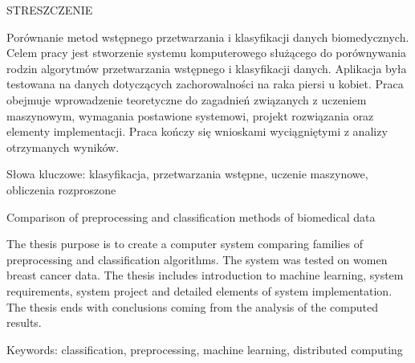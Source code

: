 \documentclass[../thesis.tex]{subfiles}
\begin{document}
\begin{center}
\fontsize{14pt}{18pt}\selectfont
STRESZCZENIE
\end{center}

\begin{flushleft}
Porównanie metod wstępnego przetwarzania i klasyfikacji danych biomedycznych. Celem pracy jest stworzenie systemu komputerowego służącego do porównywania rodzin algorytmów przetwarzania wstępnego i klasyfikacji danych. Aplikacja była testowana na danych dotyczących zachorowalności na raka piersi u kobiet. Praca obejmuje wprowadzenie teoretyczne do zagadnień związanych z uczeniem maszynowym, wymagania postawione systemowi, projekt rozwiązania oraz elementy implementacji. Praca kończy się wnioskami wyciągniętymi z analizy otrzymanych wyników.

\vspace{7.5cm}

Słowa kluczowe: klasyfikacja, przetwarzania wstępne, uczenie maszynowe, obliczenia rozproszone
\end{flushleft}

\noindent\makebox[\linewidth]{\rule{\linewidth}{0.4pt}}

\begin{center}
\fontsize{14pt}{18pt}\selectfont
Comparison of preprocessing and classification methods of biomedical data
\end{center}

\begin{flushleft}
The thesis purpose is to create a computer system comparing families of preprocessing and classification algorithms. The system was tested on women breast cancer data. The thesis includes introduction to machine learning, system requirements, system project and detailed elements of system implementation. The thesis ends with conclusions coming from the analysis of the computed results.

\vspace{7.5cm}

Keywords: classification, preprocessing, machine learning, distributed computing
\end{flushleft}

\thispagestyle{empty}
\cleardoublepage 
\end{document}
